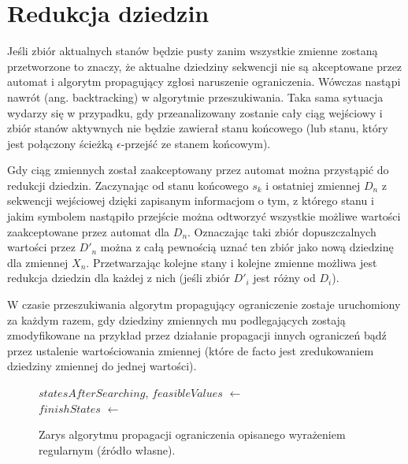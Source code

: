 \section{Redukcja dziedzin}
\par
Jeśli zbiór aktualnych stanów będzie pusty zanim wszystkie zmienne zostaną przetworzone to znaczy, że aktualne dziedziny
sekwencji nie są akceptowane przez automat i algorytm propagujący zgłosi naruszenie ograniczenia. Wówczas nastąpi nawrót
(ang. backtracking) w algorytmie przeszukiwania. Taka sama sytuacja wydarzy się w przypadku, gdy przeanalizowany zostanie cały
ciąg wejściowy i zbiór stanów aktywnych nie będzie zawierał stanu końcowego (lub stanu, który jest połączony ścieżką
$\epsilon$-przejść ze stanem końcowym).
\par
Gdy ciąg zmiennych został zaakceptowany przez automat można przystąpić do redukcji dziedzin. Zaczynając od stanu końcowego $s_k$ i
ostatniej zmiennej $D_n$ z sekwencji wejściowej dzięki zapisanym informacjom o tym, z którego stanu i jakim symbolem nastąpiło
przejście można odtworzyć wszystkie możliwe wartości zaakceptowane przez automat dla $D_n$. Oznaczając taki zbiór dopuszczalnych
wartości przez $D'_n$ można z całą pewnością uznać ten zbiór jako nową dziedzinę dla zmiennej $X_n$. Przetwarzając kolejne
stany i kolejne zmienne możliwa jest redukcja dziedzin dla każdej z nich (jeśli zbiór $D'_i$ jest różny od $D_i$).
\par
W czasie przeszukiwania algorytm propagujący ograniczenie zostaje uruchomiony za każdym razem, gdy dziedziny zmiennych
mu podlegających zostają zmodyfikowane na przykład przez działanie propagacji innych ograniczeń bądź przez ustalenie
wartościowania zmiennej (które de facto jest zredukowaniem dziedziny zmiennej do jednej wartości).
\begin{figure}
	\centering
	{\small
		\begin{pseudokod}[H]
		{
			$statesAfterSearching$, $feasibleValues$ $\leftarrow$  \\
			$finishStates$ $\leftarrow$  \\
			{
				\violateConstraint{}
			}
		}
		\caption{Zarys algorytmu propagacji ograniczenia opisanego wyrażeniem regularnym (źródło własne).}
		\label{alg:RegexFiltering}
		\end{pseudokod}
	}
\end{figure}
